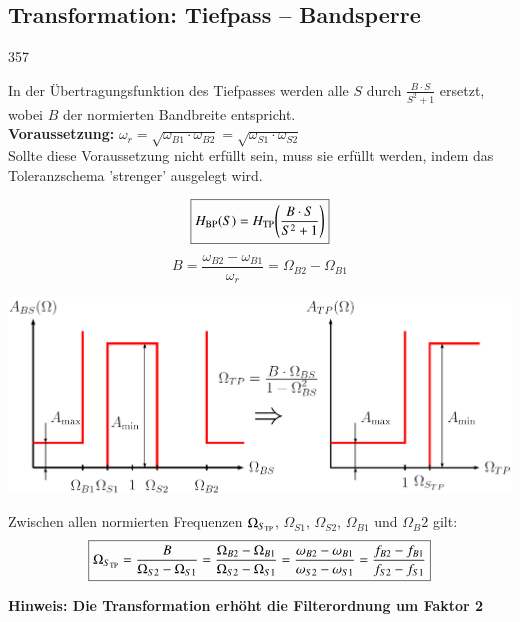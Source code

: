 \subsection{Transformation: Tiefpass -- Bandsperre}{357}

In der Übertragungsfunktion des Tiefpasses werden alle $S$ durch $\frac{B \cdot S}{S^2 + 1}$ ersetzt, wobei $B$ der normierten
Bandbreite entspricht. \\
\textbf{Voraussetzung:} $\omega_r = \sqrt{\omega_{B1} \cdot \omega_{B2}} = \sqrt{\omega_{S1} \cdot \omega_{S2} } $\\
Sollte diese Voraussetzung nicht erfüllt sein, muss sie erfüllt werden, indem das Toleranzschema 'strenger' ausgelegt wird.

\begin{minipage}[c]{0.4\columnwidth}
    $$ \boxed{H_{\rm BP}(S) = H_{\rm TP} \Bigg(\frac{B \cdot S}{S^2 + 1} \Bigg) } $$
    $$ \boxed{ B = \frac{\omega_{B2} - \omega_{B1}}{\omega_r} = \Omega_{B2} - \Omega_{B1} } $$
\end{minipage}
\hfill
\begin{minipage}[c]{0.58\columnwidth}
    \includegraphics[width=\columnwidth]{images/toleranzschema_BS_TP.png}
\end{minipage}

\vspace{0.2cm}
Zwischen allen normierten Frequenzen $\Omega_{S_{\rm TP}}$, $\Omega_{S1}$, $\Omega_{S2}$, $\Omega_{B1}$ und $\Omega_B2$ gilt:
$$ \boxed{ \Omega_{S_{\rm TP}} = \frac{B}{\Omega_{S2} - \Omega_{S1}} = \frac{\Omega_{B2} - \Omega_{B1}}{\Omega_{S2} - \Omega_{S1}}
    = \frac{\omega_{B2} - \omega_{B1}}{\omega_{S2} - \omega_{S1}} = \frac{f_{B2} - f_{B1}}{f_{S2} - f_{S1}} } $$

\textbf{Hinweis: Die Transformation erhöht die Filterordnung um Faktor 2}


